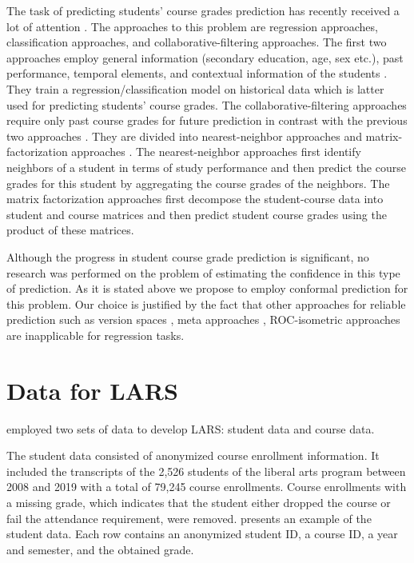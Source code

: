 \documentclass[pmlr]{jmlr}%
\begin{document}
The task of predicting students' course grades prediction has recently received a lot of attention \citep{Polyzou.2016, Houbraken.2017}. The approaches to this problem are regression approaches, classification approaches, and collaborative-filtering approaches. The first two approaches employ general information (secondary education, age, sex etc.), past performance, temporal elements, and contextual information of the students \citep{Bydzovska.2016}. They train a regression/classification model on historical data which is latter used for predicting students' course grades. The collaborative-filtering approaches require only past course grades for future prediction in contrast with the previous two approaches \citep{Sweeney.2015, Houbraken.2017}. They are divided into nearest-neighbor approaches \citep{Bydzovska.2015} and matrix-factorization approaches \citep{Polyzou.2016}. The nearest-neighbor approaches first identify neighbors of a student in terms of study performance and then predict the course grades for this student by aggregating the course grades of the neighbors. The matrix factorization approaches first decompose the student-course data into student and course matrices and then predict student course grades using the product of these matrices.

Although the progress in  student course grade prediction is significant, no research was performed on the problem of estimating the confidence in this type of prediction. As it is stated above we propose to employ conformal prediction for this problem. Our choice is justified by the fact that other approaches for reliable prediction such as version spaces \citep{Smirnov.2004}, meta approaches \citep{Smirnov.2006, Smirnov.2006b}, ROC-isometric approaches \citep{Vanderlooy.2006} are 
inapplicable for regression tasks.

\section{Data for LARS}
\label{sec:data}

\citet{Morsomme.2019} employed two sets of data to develop LARS: student data and course data.

The student data consisted of anonymized course enrollment information. It included the transcripts of the 2,526 students of the liberal arts program between 2008 and 2019 with a total of 79,245 course enrollments. Course enrollments with a missing grade, which indicates that the student either dropped the course or fail the attendance requirement, were removed.  presents an example of the student data. Each row contains an anonymized student ID, a course ID, a year and semester, and the obtained grade.
\end{document}
